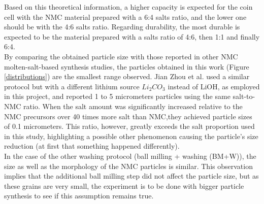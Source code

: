 \documentclass{article}
\begin{document}
Based on this theoretical information, a higher capacity is expected for the coin cell with the NMC material prepared with a 6:4 salts ratio, and the lower one should be with the 4:6 salts ratio. Regarding durability, the most durable is expected to be the material prepared with a salts ratio of 4:6, then 1:1 and finally 6:4.\\

By comparing the obtained particle size with those reported in other NMC molten-salt-based synthesis studies, the particles obtained in this work (Figure \ref{distributions}) are the smallest range observed. Jian Zhou et al. used a similar protocol but with a different lithium source \(Li_2CO_3\) instead of LiOH, as employed in this project, and reported 1 to 5 micrometers particles using the same salt-to-NMC ratio. When the salt amount was significantly increased relative to the NMC precursors over 40 times more salt than NMC,they achieved particle sizes of 0.1 micrometers. This ratio, however, greatly exceeds the salt proportion used in this study, highlighting a possible other phenomenon causing the particle's size reduction (at first that something happened differently)\cite{Jian}\cite{shape}.\\

In the case of the other washing protocol (ball milling + washing (BM+W)), the size as well as the morphology of the NMC particles is similar. This observation implies that the additional ball milling step did not affect the particle size, but as these grains are very small, the experiment is  to be done with bigger particle synthesis to see if this assumption remains true.\\
\end{document}
